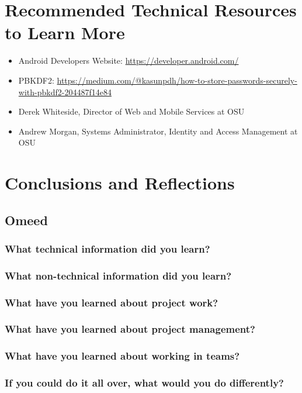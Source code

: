 \documentclass[onecolumn, draftclsnofoot,10pt, compsoc]{IEEEtran}
\begin{document}
\section{Recommended Technical Resources to Learn More}
  \begin{itemize}
    \item Android Developers Website: \url{https://developer.android.com/}
    \item PBKDF2: \url{https://medium.com/@kasunpdh/how-to-store-passwords-securely-with-pbkdf2-204487f14e84}
    \item Derek Whiteside, Director of Web and Mobile Services at OSU
    \item Andrew Morgan, Systems Administrator, Identity and Access Management at OSU
  \end{itemize}

\section{Conclusions and Reflections}
  \subsection{Omeed}
    \subsubsection{What technical information did you learn?}
    \subsubsection{What non-technical information did you learn?}
    \subsubsection{What have you learned about project work?}
    \subsubsection{What have you learned about project management?}
    \subsubsection{What have you learned about working in teams?}
    \subsubsection{\textbf{If you could do it all over, what would you do differently?}}
  \newpage
\end{document}
